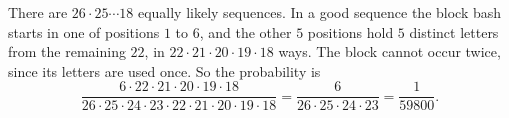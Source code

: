 There are $26\cdot25\cdots18$ equally likely sequences. In a good sequence the block bash starts in one of positions $1$ to $6$, and the other $5$ positions hold $5$ distinct letters from the remaining $22$, in $22\cdot21\cdot20\cdot19\cdot18$ ways. The block cannot occur twice, since its letters are used once. So the probability is
\[
\dfrac{6\cdot22\cdot21\cdot20\cdot19\cdot18}{26\cdot25\cdot24\cdot23\cdot22\cdot21\cdot20\cdot19\cdot18}=\dfrac{6}{26\cdot25\cdot24\cdot23}=\boxed{\dfrac{1}{59800}} .
\]
